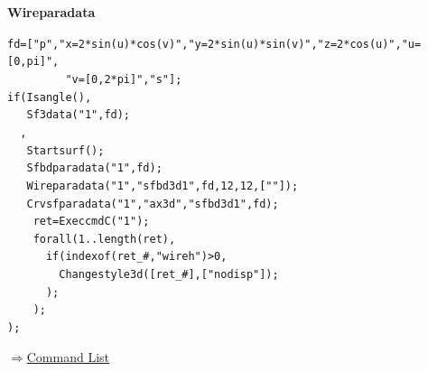 \documentclass[papersize,a4paper,12pt]{article}
\newenvironment{cmd}[2]{
\hypertarget{#2}{}
\begin{center}{\bf\large #1}\end{center}
\begin{description}
}{
\end{description}
\begin{flushright} \hyperlink{functionlist}{$\Rightarrow$Command List}\end{flushright}
}
\begin{document}
\begin{cmd}{Wireparadata}{wireparadata}
\begin{center}

\end{center}

\verb|fd=["p","x=2*sin(u)*cos(v)","y=2*sin(u)*sin(v)","z=2*cos(u)","u=[0,pi]",|\\
\verb|         "v=[0,2*pi]","s"];|\\
\verb|if(Isangle(),|\\
\verb|   Sf3data("1",fd);|\\
\verb|  ,|\\
\verb|   Startsurf();|\\
\verb|   Sfbdparadata("1",fd);|\\
\verb|   Wireparadata("1","sfbd3d1",fd,12,12,[""]);|\\
\verb|   Crvsfparadata("1","ax3d","sfbd3d1",fd);|\\
\verb|    ret=ExeccmdC("1");|\\
\verb|    forall(1..length(ret),|\\
\verb|      if(indexof(ret_#,"wireh")>0,|\\
\verb|        Changestyle3d([ret_#],["nodisp"]);|\\
\verb|      );|\\
\verb|    );|\\
\verb|);|

\begin{center}

\end{center}

\end{cmd}
\end{document}
